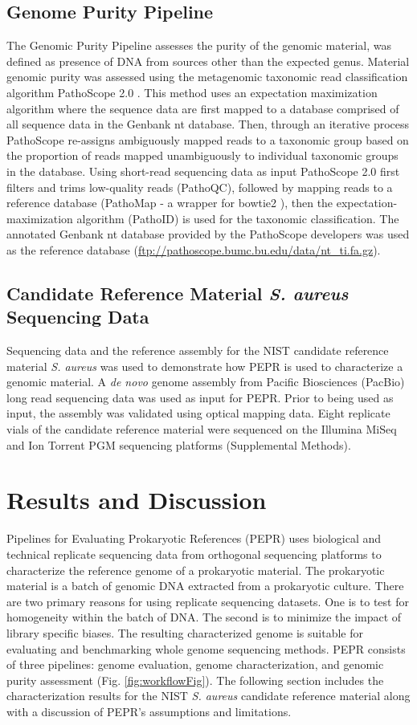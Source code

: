 \documentclass[smallextended]{svjour3}\usepackage[]{graphicx}\usepackage[]{color}
\begin{document}
\subsection{Genome Purity Pipeline}
\label{method:4}
The Genomic Purity Pipeline assesses the purity of the genomic material, was defined as presence of DNA from sources other than the expected genus. 
Material genomic purity was assessed using the metagenomic taxonomic read classification algorithm PathoScope 2.0 \cite{Hong2014}. 
This method uses an expectation maximization algorithm where the sequence data are first mapped to a database comprised of all sequence data in the Genbank nt database. 
Then, through an iterative process PathoScope re-assigns ambiguously mapped reads to a taxonomic group based on the proportion of reads mapped unambiguously to individual taxonomic groups in the database. 
Using short-read sequencing data as input PathoScope 2.0 first filters and trims low-quality reads (PathoQC), followed by mapping reads to a reference database (PathoMap - a wrapper for bowtie2 \cite{Langmead2012}), then the expectation-maximization algorithm (PathoID) is used for the taxonomic classification. 
The annotated Genbank nt database provided by the PathoScope developers was used as the reference database (\url{ftp://pathoscope.bumc.bu.edu/data/nt_ti.fa.gz}). 


\subsection{Candidate Reference Material \textit{S. aureus} Sequencing Data}
Sequencing data and the reference assembly for the NIST candidate reference material \textit{S. aureus} was used to demonstrate how PEPR is used to characterize a genomic material. 
A \textit{de novo} genome assembly from Pacific Biosciences (PacBio) long read sequencing data was used as input for PEPR. 
Prior to being used as input, the assembly was validated using optical mapping data. 
Eight replicate vials of the candidate reference material were sequenced on the Illumina MiSeq and Ion Torrent PGM sequencing platforms (Supplemental Methods).

\section{Results and Discussion}
Pipelines for Evaluating Prokaryotic References (PEPR) uses biological and technical replicate sequencing data from orthogonal sequencing platforms to characterize the reference genome of a prokaryotic material. 
The prokaryotic material is a batch of genomic DNA extracted from a prokaryotic culture. 
There are two primary reasons for using replicate sequencing datasets. 
One is to test for homogeneity within the batch of DNA. 
The second is to minimize the impact of library specific biases. 
The resulting characterized genome is suitable for  evaluating and benchmarking whole genome sequencing methods. 
PEPR consists of three pipelines: genome evaluation, genome characterization, and genomic purity assessment (Fig. \ref{fig:workflowFig}). 
The following section includes the characterization results for the NIST \textit{S. aureus} candidate reference material along with a discussion of PEPR's assumptions and limitations. 
\end{document}
